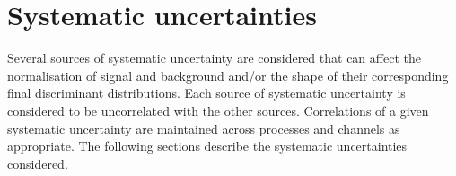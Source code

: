 \section{Systematic uncertainties}
\label{sec:systematics}
				   
Several sources of systematic uncertainty are considered that can affect the normalisation of signal 
and background and/or the shape of their corresponding final discriminant distributions.  
Each source of systematic uncertainty is considered to be uncorrelated with the other sources.  
Correlations of a given systematic uncertainty are maintained across processes and channels 
as appropriate.
The following sections describe the systematic uncertainties considered.

